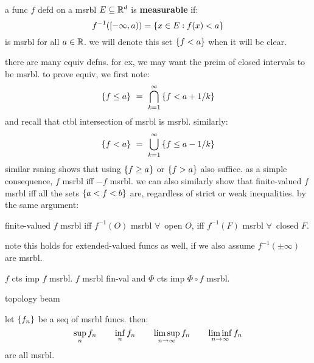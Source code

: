 \newpage
\begin{defn}
    a func $f$ defd on a msrbl $E\subseteq\mathbb{R}^{d}$ is \textbf{measurable} if:
    \begin{equation*}
        f^{-1}([-\infty,a))=\left\{{x\in E:f(x)<a}\right\}
    \end{equation*}
    is msrbl for all $a\in\mathbb{R}$.
    we will denote this set $\left\{{f<a}\right\}$ when it will be clear.
\end{defn}
there are many equiv defns.
for ex, we may want the preim of closed intervals to be msrbl.
to prove equiv, we first note:
\begin{equation*}
    \set{f\leq a} \ = \ \bigcap_{k=1}^{\infty}\set{f<a+1/k}
\end{equation*}
and recall that ctbl intersection of msrbl is msrbl. similarly:
\begin{equation*}
    \set{f<a} \ = \ \bigcup_{k=1}^{\infty}\set{f\leq a-1/k}
\end{equation*}
similar rsning shows that using $\left\{{f\geq a}\right\}$ or $\left\{{f>a}\right\}$ also suffice.
as a simple consequence, $f$ msrbl iff $-f$ msrbl.
we can also similarly show that finite-valued $f$ msrbl iff all the sets
$\left\{{a<f<b}\right\}$ are, regardless of strict or weak inequalities.
by the same argument:

\begin{crll}
    finite-valued $f$ msrbl iff $f^{-1}(O)$ msrbl $\forall \, $ open $O$,
    iff $f^{-1}(F)$ msrbl $\forall \, $ closed $F$.
\end{crll}

note this holds for extended-valued funcs as well, if we also assume
$f^{-1}(\pm \infty)$ are msrbl.

\begin{crll}
    $f$ cts imp $f$ msrbl.
    $f$ msrbl fin-val and $\Phi$ cts imp $\Phi\circ f$ msrbl.
\end{crll}

topology beam

\begin{crll}
    let $\left\{{f_{n}}\right\}$ be a seq of msrbl funcs. then:
    \begin{equation*}
        \sup_{n}f_{n} \qquad \inf_{n}f_{n} \qquad
        \limsup_{n\rightarrow\infty}f_{n} \qquad \liminf_{n\rightarrow\infty}f_{n}
    \end{equation*}
    are all msrbl.
\end{crll}

